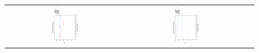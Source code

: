 \begin{figure}[h]
\begin{tabular}{ccc}
\\
 \includegraphics[width=0.23\textwidth, angle=-90,origin=c]{Images/WFG2_3obj_Scalability.eps} &
  \includegraphics[width=0.23\textwidth,   angle=-90,origin=c]{Images/WFG8_3obj_Scalability.eps}  
\end{tabular}
\end{figure}


